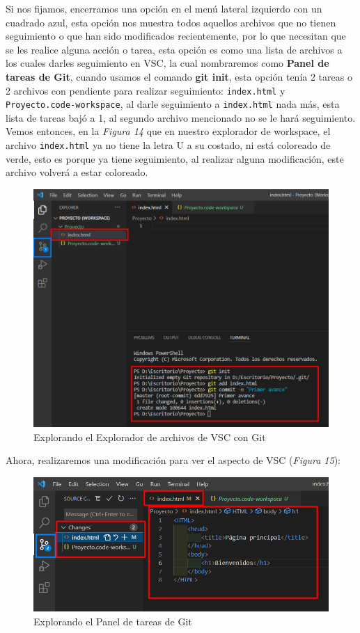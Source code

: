 Si nos fijamos, encerramos una opción en el menú lateral izquierdo con un cuadrado azul, esta opción nos muestra todos aquellos archivos que no tienen seguimiento o que han sido modificados recientemente, por lo que necesitan que se les realice alguna acción o tarea, esta opción es como una lista de archivos a los cuales darles seguimiento en VSC, la cual nombraremos como \textbf{Panel de tareas de Git}, cuando usamos el comando \textbf{git init}, esta opción tenía 2 tareas o 2 archivos con pendiente para realizar seguimiento: \texttt{index.html} y \texttt{Proyecto.code-workspace}, al darle seguimiento a \texttt{index.html} nada más, esta lista de tareas bajó a 1, al segundo archivo mencionado no se le hará seguimiento. Vemos entonces, en la \textit{Figura 14} que en nuestro explorador de workspace, el archivo \texttt{index.html} ya no tiene la letra U a su costado, ni está coloreado de verde, esto es porque ya tiene seguimiento, al realizar alguna modificación, este archivo volverá a estar coloreado.
\begin{figure}[H]
    \begin{center}
        \caption{Explorando el Explorador de archivos de VSC con Git}
        \label{fig: 14}
        \includegraphics[width=12cm]{capturas/git add git commit.png}
    \end{center}
\end{figure}

Ahora, realizaremos una modificación para ver el aspecto de VSC (\textit{Figura 15}):
\begin{figure}[H]
    \begin{center}
        \caption{Explorando el Panel de tareas de Git}
        \label{fig: 15}
        \includegraphics[width=12cm]{capturas/modificaciones.png}
    \end{center}
\end{figure}

